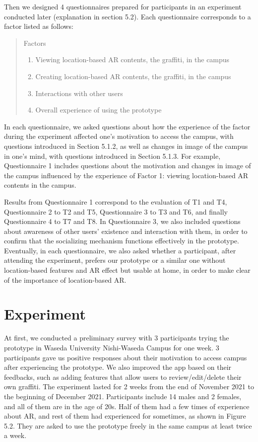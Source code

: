 Then we designed 4 questionnaires prepared for participants in an experiment conducted later (explanation in section 5.2). Each questionnaire corresponds to a factor listed as follows:

\begin{quote}
  Factors
  \begin{enumerate}
    \item Viewing location-based AR contents, the graffiti, in the campus
    \item Creating location-based AR contents, the graffiti, in the campus
    \item Interactions with other users
    \item Overall experience of using the prototype
  \end{enumerate}
\end{quote}

In each questionnaire, we asked questions about how the experience of the factor during the experiment affected one's motivation to access the campus, with questions introduced in Section 5.1.2, as well as changes in image of the campus in one's mind, with questions introduced in Section 5.1.3.
For example, Questionnaire 1 includes questions about the motivation and changes in image of the campus influenced by the experience of Factor 1: viewing location-based AR contents in the campus.

Results from Questionnaire 1 correspond to the evaluation of T1 and T4, Questionnaire 2 to T2 and T5, Questionnaire 3 to T3 and T6, and finally Questionnaire 4 to T7 and T8.
In Questionnaire 3, we also included questions about awareness of other users' existence and interaction with them, in order to confirm that the socializing mechanism functions effectively in the prototype.
Eventually, in each questionnaire, we also asked whether a participant, after attending the experiment, prefers our prototype or a similar one without location-based features and AR effect but usable at home,
in order to make clear of the importance of location-based AR.

\section{Experiment}

At first, we conducted a preliminary survey with 3 participants trying the prototype in Waseda University Nishi-Waseda Campus for one week.
3 participants gave us positive responses about their motivation to access campus after experiencing the prototype.
We also improved the app based on their feedbacks, such as adding features that allow users to review/edit/delete their own graffiti.
The experiment lasted for 2 weeks from the end of November 2021 to the beginning of December 2021. Participants include 14 males and 2 females, and all of them are in the age of 20s.
Half of them had a few times of experience about AR, and rest of them had experienced for sometimes, as shown in Figure 5.2.
They are asked to use the prototype freely in the same campus at least twice a week.

